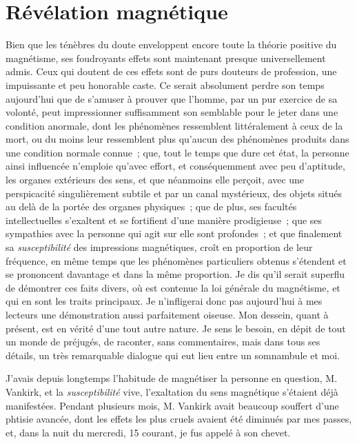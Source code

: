 \documentclass[french,twoside]{book} %
\begin{document}
\section[{Révélation magnétique}]{Révélation magnétique}\renewcommand{\leftmark}{Révélation magnétique}

\noindent Bien que les ténèbres du doute enveloppent encore toute la théorie positive du magnétisme, ses foudroyants effets sont maintenant presque universellement admis. Ceux qui doutent de ces effets sont de purs douteurs de profession, une impuissante et peu honorable caste. Ce serait absolument perdre son temps aujourd’hui que de s’amuser à prouver que l’homme, par un pur exercice de sa volonté, peut impressionner suffisamment son semblable pour le jeter dans une condition anormale, dont les phénomènes ressemblent littéralement à ceux de la mort, ou du moins leur ressemblent plus qu’aucun des phénomènes produits dans une condition normale connue ; que, tout le temps que dure cet état, la personne ainsi influencée n’emploie qu’avec effort, et conséquemment avec peu d’aptitude, les organes extérieurs des sens, et que néanmoins elle perçoit, avec une perspicacité singulièrement subtile et par un canal mystérieux, des objets situés au delà de la portée des organes physiques ; que de plus, ses facultés intellectuelles s’exaltent et se fortifient d’une manière prodigieuse ; que ses sympathies avec la personne qui agit sur elle sont profondes ; et que finalement sa \emph{susceptibilité} des impressions magnétiques, croît en proportion de leur fréquence, en même temps que les phénomènes particuliers obtenus s’étendent et se prononcent davantage et dans la même proportion. Je dis qu’il serait superflu de démontrer ces faits divers, où est contenue la loi générale du magnétisme, et qui en sont les traits principaux. Je n’infligerai donc pas aujourd’hui à mes lecteurs une démonstration aussi parfaitement oiseuse. Mon dessein, quant à présent, est en vérité d’une tout autre nature. Je sens le besoin, en dépit de tout un monde de préjugés, de raconter, sans commentaires, mais dans tous ses détails, un très remarquable dialogue qui eut lieu entre un somnambule et moi.\par
J’avais depuis longtemps l’habitude de magnétiser la personne en question, M. Vankirk, et la \emph{susceptibilité} vive, l’exaltation du sens magnétique s’étaient déjà manifestées. Pendant plusieurs mois, M. Vankirk avait beaucoup souffert d’une phtisie avancée, dont les effets les plus cruels avaient été diminués par mes passes, et, dans la nuit du mercredi, 15 courant, je fus appelé à son chevet.\par
\end{document}
